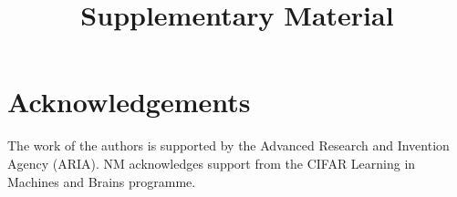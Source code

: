 \documentclass[preprint]{uai2026} %
\begin{document}
\section*{Acknowledgements}

The work of the authors is supported by the Advanced Research and Invention Agency (ARIA). NM acknowledges support from the CIFAR Learning in Machines and Brains programme.

\FloatBarrier



\newpage

\onecolumn

\title{Supplementary Material}

\appendix
\end{document}
